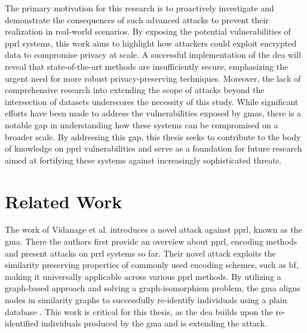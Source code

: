 The primary motivation for this research is to proactively investigate and demonstrate the consequences of such advanced attacks to prevent their realization in real-world scenarios.
By exposing the potential vulnerabilities of \ac{pprl} systems, this work aims to highlight how attackers could exploit encrypted data to compromise privacy at scale. 
A successful implementation of the \ac{dea} will reveal that state-of-the-art methods are insufficiently secure, emphasizing the urgent need for more robust privacy-preserving techniques.
Moreover, the lack of comprehensive research into extending the scope of attacks beyond the intersection of datasets underscores the necessity of this study. 
While significant efforts have been made to address the vulnerabilities exposed by \ac{gma}s, there is a notable gap in understanding how these systems can be compromised on a broader scale.
By addressing this gap, this thesis seeks to contribute to the body of knowledge on \ac{pprl} vulnerabilities and serve as a foundation for future research aimed at fortifying these systems against increasingly sophisticated threats.



\section{Related Work}  \label{sec:rel-work}

The work of Vidanage et al. \cite{vidanage2020graph} introduces a novel attack against \ac{pprl}, known as the \ac{gma}.
There the authors first provide an overview about \ac{pprl}, encoding methods and present attacks on \ac{prrl} systems so far.
Their novel attack exploits the similarity preserving properties of commonly used encoding schemes, such as \ac{bf}, making it universally applicable across various \ac{pprl} methods.
By utilizing a graph-based approach and solving a graph-isomorphism problem, the \ac{gma} aligns nodes in similarity graphs to successfully re-identify individuals using a plain database \cite{vidanage2020graph}.
This work is critical for this thesis, as the \ac{dea} builds upon the re-identified individuals produced by the \ac{gma} and is extending the attack.


